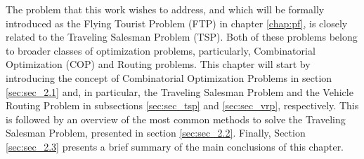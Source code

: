 
The problem that this work wishes to address, and which will be formally introduced as the Flying Tourist Problem (FTP) in chapter \ref{chap:pf}, is closely related to the Traveling Salesman Problem (TSP). Both of these problems belong to broader classes of optimization problems, particularly, Combinatorial Optimization (COP) and Routing problems. This chapter will start by introducing the concept of Combinatorial Optimization Problems in section \ref{sec:sec_2.1} and, in particular, the Traveling Salesman Problem  and the Vehicle Routing Problem in subsections \ref{sec:sec_tsp} and \ref{sec:sec_vrp}, respectively. This is followed by an overview of the most common methods to solve the Traveling Salesman Problem, presented in section \ref{sec:sec_2.2}. Finally, Section \ref{sec:sec_2.3} presents a brief summary of the main conclusions of this chapter.

